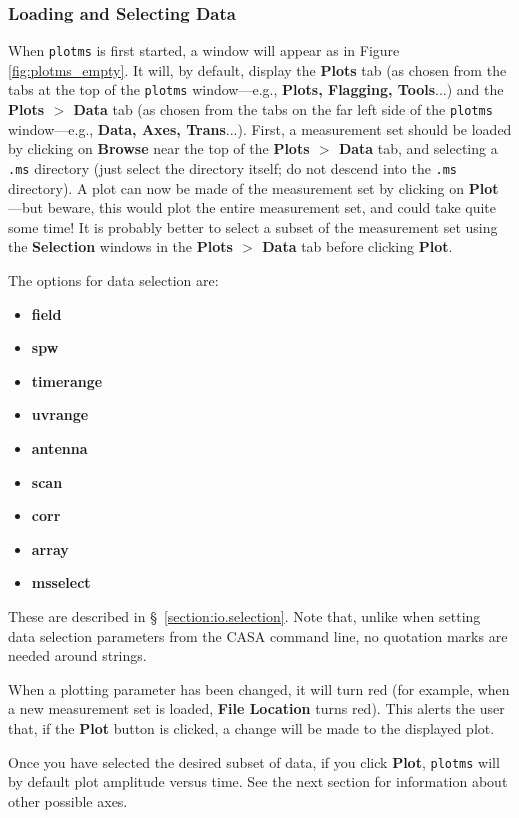 \subsubsection{Loading and Selecting Data}
\label{section:edit.plot.plotms.select}

When {\tt plotms} is first started, a window will appear as in Figure \ref{fig:plotms_empty}. It will, by default, display the {\bf Plots} tab (as chosen from the tabs at the top of the {\tt plotms} window---e.g., {\bf Plots, Flagging, Tools}...) and the {\bf Plots $>$ Data} tab (as chosen from the tabs on the far left side of the {\tt plotms} window---e.g., {\bf Data, Axes, Trans}...). First, a measurement set should be loaded by clicking on {\bf Browse} near the top of the {\bf Plots $>$ Data} tab, and selecting a {\tt .ms} directory (just select the directory itself; do not descend into the {\tt .ms} directory). A plot can now be made of the measurement set by clicking on {\bf Plot}---but beware, this would plot the entire measurement set, and could take quite some time! It is probably better to select a subset of the measurement set using the {\bf Selection} windows in the {\bf Plots $>$ Data} tab before clicking {\bf Plot}.

The options for data selection are:
\begin{itemize}
   \item {\bf field}
   \item {\bf spw}
   \item {\bf timerange}
   \item {\bf uvrange}
   \item {\bf antenna}
   \item {\bf scan}
   \item {\bf corr}
   \item {\bf array}
   \item {\bf msselect}
\end{itemize}
These are described in \S~\ref{section:io.selection}. Note that, unlike when setting data selection parameters from the CASA command line, no quotation marks are needed around strings. 

When a plotting parameter has been changed, it will turn red (for example, when a new measurement set is loaded, {\bf File Location} turns red). This alerts the user that, if the {\bf Plot} button is clicked, a change will be made to the displayed plot.

Once you have selected the desired subset of data, if you click {\bf Plot}, {\tt plotms} will by default plot amplitude versus time. See the next section for information about other possible axes. 

